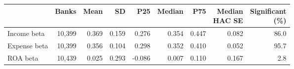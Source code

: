 \begin{tabular}{lrrrrrrrr}
\toprule
 & Banks & Mean & SD & P25 & Median & P75 & \shortstack{Median\\HAC SE} & \shortstack{Significant\\(\%)} \\
\midrule
Income beta & 10,399 & 0.369 & 0.159 & 0.276 & 0.354 & 0.447 & 0.082 & 86.0 \\
Expense beta & 10,399 & 0.356 & 0.104 & 0.298 & 0.352 & 0.410 & 0.052 & 95.7 \\
ROA beta & 10,439 & 0.025 & 0.293 & -0.086 & 0.007 & 0.110 & 0.167 & 2.8 \\
\bottomrule
\end{tabular}
